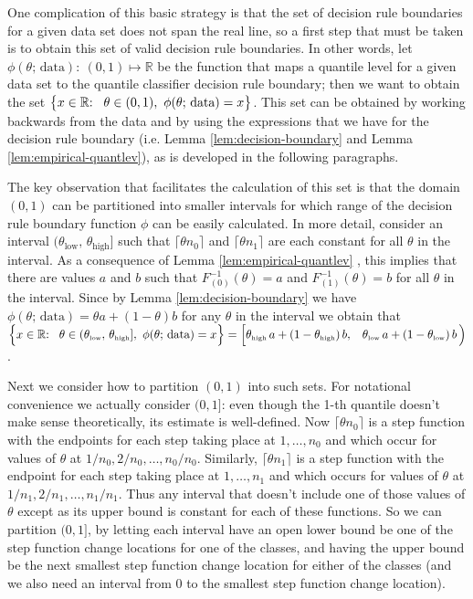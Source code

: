 One complication of this basic strategy is that the set of decision rule
boundaries for a given data set does not span the real line, so a first step
that must be taken is to obtain this set of valid decision rule boundaries.  In
other words, let $\phi(\theta;\, \text{data}){:}~ (0, 1) \mapsto \mathbb{R}$ be
the function that maps a quantile level for a given data set to the quantile
classifier decision rule boundary; then we want to obtain the set
$\big\{ x \in \mathbb{R}{:} \hspace{3mm} \theta \in (0, 1),~ \phi(\theta;\,
\text{data}) = x \big\}$.  This set can be obtained by working backwards from
the data and by using the expressions that we have for the decision rule
boundary (i.e. Lemma \ref{lem:decision-boundary} and Lemma
\ref{lem:empirical-quantlev}), as is developed in the following paragraphs.

The key observation that facilitates the calculation of this set is that the
domain $(0, 1)$ can be partitioned into smaller intervals for which range of the
decision rule boundary function $\phi$ can be easily calculated.  In more
detail, consider an interval
$(\theta_{\scriptscriptstyle\text{low}},\,
\theta_{\scriptscriptstyle\text{high}}]$ such that $\lceil \theta n_0 \rceil$
and $\lceil \theta n_1 \rceil$ are each constant for all $\theta$ in the
interval.  As a consequence of Lemma \ref{lem:empirical-quantlev} , this implies
that there are values $a$ and $b$ such that $F_{(0)}^{-1}(\theta) = a$ and
$F_{(1)}^{-1}(\theta) = b$ for all $\theta$ in the interval.  Since by Lemma
\ref{lem:decision-boundary} we have
$\phi(\theta;\, \text{data}) = \theta a + (1 - \theta) b$ for any $\theta$ in
the interval we obtain that
$\Big\{ x \in \mathbb{R}{:} \hspace{3mm} \theta \in
(\theta_{\scriptscriptstyle\text{low}},\,
\theta_{\scriptscriptstyle\text{high}}],~ \phi(\theta;\, \text{data}) = x \Big\}
= \Big[ \theta_{\scriptscriptstyle\text{high}}\, a + (1 -
\theta_{\scriptscriptstyle\text{high}})\, b, \hspace{3mm}
\theta_{\scriptscriptstyle\text{low}}\, a + (1 -
\theta_{\scriptscriptstyle\text{low}})\, b\, \Big)$.

Next we consider how to partition $(0, 1)$ into such sets.  For notational
convenience we actually consider $(0, 1]$: even though the 1-th quantile doesn't
make sense theoretically, its estimate is well-defined.  Now
$\lceil \theta n_0 \rceil$ is a step function with the endpoints for each step
taking place at $1, \dots, n_0$ and which occur for values of $\theta$ at
$1 / n_0, 2 / n_0, \dots, n_0 / n_0$.  Similarly, $\lceil \theta n_1 \rceil$ is
a step function with the endpoint for each step taking place at $1, \dots, n_1$
and which occurs for values of $\theta$ at $1 / n_1, 2 / n_1, \dots, n_1 / n_1$.
Thus any interval that doesn't include one of those values of $\theta$ except as
its upper bound is constant for each of these functions.  So we can partition
$(0, 1]$, by letting each interval have an open lower bound be one of the step
function change locations for one of the classes, and having the upper bound be
the next smallest step function change location for either of the classes (and
we also need an interval from 0 to the smallest step function change location).

